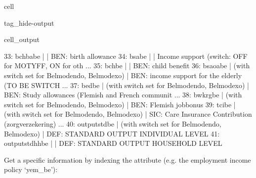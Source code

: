 \documentclass[letterpaper,10pt,english]{sphinxmanual}
\begin{document}
\begin{sphinxuseclass}{cell}
\begin{sphinxuseclass}{tag_hide-output}
\begin{sphinxuseclass}{cell_output}
\begin{sphinxVerbatim}[commandchars=\\\{\}]
33: bchba\PYGZus{}be             |                                                       |    BEN: birth allowance 
34: bsa\PYGZus{}be               |                                                       |    Income support (switch: OFF for MOTYFF, ON for oth ... 
35: bch\PYGZus{}be               |                                                       |    BEN: child benefit 
36: bsaoa\PYGZus{}be             |  (with switch set for Belmod\PYGZus{}endo, Belmod\PYGZus{}exo)        |    \PYGZdq{}BEN: income support for the elderly (TO BE SWITCH ... 
37: bed\PYGZus{}be               |  (with switch set for Belmod\PYGZus{}endo, Belmod\PYGZus{}exo)        |    BEN: Study allowances (Flemish and French communit ... 
38: bwkrg\PYGZus{}be             |  (with switch set for Belmod\PYGZus{}endo, Belmod\PYGZus{}exo)        |    BEN: Flemish jobbonus 
39: tci\PYGZus{}be               |  (with switch set for Belmod\PYGZus{}endo, Belmod\PYGZus{}exo)        |    SIC: Care Insurance Contribution (zorgverzekering) ... 
40: output\PYGZus{}std\PYGZus{}be        |  (with switch set for Belmod\PYGZus{}endo, Belmod\PYGZus{}exo)        |    DEF: STANDARD OUTPUT INDIVIDUAL LEVEL 
41: output\PYGZus{}std\PYGZus{}hh\PYGZus{}be     |                                                       |    DEF: STANDARD OUTPUT HOUSEHOLD LEVEL 
\end{sphinxVerbatim}

\end{sphinxuseclass}
\end{sphinxuseclass}
\end{sphinxuseclass}
\sphinxAtStartPar
Get a  specific information by indexing the  attribute (e.g. the employment income policy ‘yem\_be’):
\end{document}
